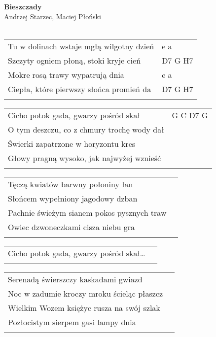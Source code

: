 \documentclass[a5paper]{article}
\begin{document}


\noindent
\fontsize{12pt}{15pt}\selectfont
\textbf{Bieszczady} \\
\fontsize{8pt}{10pt}\selectfont
Andrzej Starzec, Maciej Płoński \\ \\
\fontsize{10pt}{12pt}\selectfont
{}
\begin{tabular}{@{}p{8.5cm}p{3cm}@{}}
\noindent
Tu w dolinach wstaje mgłą wilgotny dzień & e a \\
Szczyty ogniem płoną, stoki kryje cień & D7 G H7 \\
Mokre rosą trawy wypatrują dnia & e a \\
Ciepła, które pierwszy słońca promień da & D7 G H7 \\ \\
\end{tabular}

\noindent
\begin{tabular}{@{}p{7.5cm}p{3cm}@{}}
Cicho potok gada, gwarzy pośród skał & G C D7 G \\
O tym deszczu, co z chmury trochę wody dał \\
Świerki zapatrzone w horyzontu kres \\
Głowy pragną wysoko, jak najwyżej wznieść \\ \\
\end{tabular}

\noindent
\begin{tabular}{@{}p{9.5cm}p{3cm}@{}}
Tęczą kwiatów barwny połoniny łan \\
Słońcem wypełniony jagodowy dzban \\
Pachnie świeżym sianem pokos pysznych traw \\
Owiec dzwoneczkami cisza niebu gra \\ \\
\end{tabular}

\noindent
\begin{tabular}{@{}p{8.5cm}p{3cm}@{}}
Cicho potok gada, gwarzy pośród skał… \\ \\
\end{tabular}

\noindent
\begin{tabular}{@{}p{9.5cm}p{3cm}@{}} 
Serenadą świerszczy kaskadami gwiazd \\
Noc w zadumie kroczy mroku ścieląc płaszcz \\
Wielkim Wozem księżyc rusza na swój szlak \\
Pozłocistym sierpem gasi lampy dnia \\ \\
\end{tabular}
\end{document}
